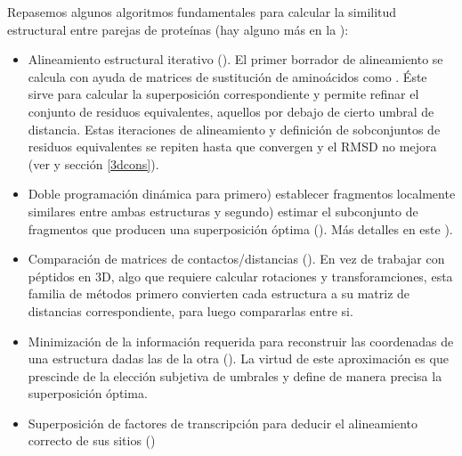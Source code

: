 Repasemos algunos algoritmos fundamentales para calcular la similitud estructural entre parejas de prote\'{i}nas
(hay alguno m\'{a}s en la ):
\begin{itemize}

\item Alineamiento estructural iterativo (). 
El primer borrador de alineamiento se calcula con ayuda de  matrices de sustituci\'{o}n de amino\'{a}cidos como 
. \'{E}ste sirve para calcular la superposici\'{o}n correspondiente y 
permite refinar el conjunto de residuos equivalentes, aquellos por debajo de cierto umbral de distancia.
Estas iteraciones de alineamiento y definici\'{o}n de sobconjuntos de residuos equivalentes se repiten hasta que convergen y 
el RMSD no mejora (ver \citet{Chothia1986} y secci\'{o}n \ref{3dcons}).

\item Doble programaci\'{o}n din\'{a}mica para primero) establecer fragmentos localmente similares entre ambas estructuras y 
segundo) estimar el subconjunto de fragmentos que producen una superposici\'{o}n \'{o}ptima 
(). 
M\'{a}s detalles en este ).


\item Comparaci\'{o}n de matrices de contactos/distancias ().
En vez de trabajar con p\'{e}ptidos en 3D, algo que requiere calcular rotaciones y transforamciones, 
esta familia de m\'{e}todos primero convierten cada estructura a su matriz de distancias correspondiente,
para luego compararlas entre si.


\item Minimizaci\'{o}n de la informaci\'{o}n requerida para reconstruir las coordenadas de una estructura dadas las de la otra
(). La virtud de este aproximaci\'{o}n es que prescinde 
de la elecci\'{o}n subjetiva de umbrales y define de manera precisa la superposici\'{o}n \'{o}ptima.

\item Superposici\'{o}n de factores de transcripci\'{o}n para deducir el alineamiento correcto de sus sitios  
()

\end{itemize}

